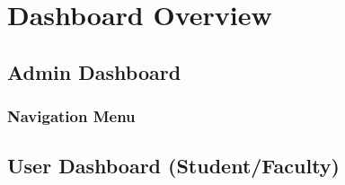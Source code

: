 \newpage
\section{Dashboard Overview}


\subsection{Admin Dashboard}


\subsubsection{Navigation Menu}



\subsection{User Dashboard (Student/Faculty)}
